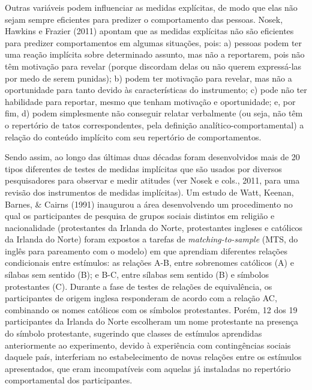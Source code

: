 Outras variáveis podem influenciar as medidas explícitas, de modo que elas não sejam sempre eficientes para predizer o comportamento das pessoas. Nosek, Hawkins e Frazier (2011) apontam que as medidas explícitas não são eficientes para predizer comportamentos em algumas situações, pois: a) pessoas podem ter uma reação implícita sobre determinado assunto, mas não a reportarem, pois não têm motivação para revelar (porque discordam delas ou não querem expressá-las por medo de serem punidas); b) podem ter motivação para revelar, mas não a oportunidade para tanto devido às características do instrumento; c) pode não ter habilidade para reportar, mesmo que tenham motivação e oportunidade; e, por fim, d) podem simplesmente não conseguir relatar verbalmente (ou seja, não têm o repertório de tatos correspondentes, pela definição analítico-comportamental) a relação do conteúdo implícito com seu repertório de comportamentos.

Sendo assim, ao longo das últimas duas décadas foram desenvolvidos mais de 20 tipos diferentes de testes de medidas implícitas que são usados por diversos pesquisadores para observar e medir atitudes (ver Nosek e cols., 2011, para uma revisão dos instrumentos de medidas implícitas). Um estudo de Watt, Keenan, Barnes, \& Cairns (1991) inaugurou a área desenvolvendo um procedimento no qual os participantes de pesquisa de grupos sociais distintos em religião e nacionalidade (protestantes da Irlanda do Norte, protestantes ingleses e católicos da Irlanda do Norte) foram expostos a tarefas de \textit{matching-to-sample} (MTS, do inglês para pareamento com o modelo) em que aprendiam diferentes relações condicionais entre estímulos: as relações A-B, entre sobrenomes católicos (A) e sílabas sem sentido (B); e B-C, entre sílabas sem sentido (B) e símbolos protestantes (C). Durante a fase de testes de relações de equivalência, os participantes de origem inglesa responderam de acordo com a relação AC, combinando os nomes católicos com os símbolos protestantes. Porém, 12 dos 19 participantes da Irlanda do Norte escolheram um nome protestante na presença do símbolo protestante, sugerindo que classes de estímulos aprendidas anteriormente ao experimento, devido à experiência com contingências sociais daquele país, interferiam no estabelecimento de novas relações entre os estímulos apresentados, que eram incompatíveis com aquelas já instaladas no repertório comportamental dos participantes.

